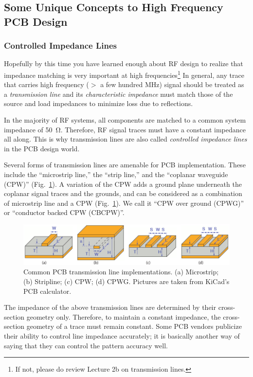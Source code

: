 \documentclass[12pt,letterpaper]{scrartcl}
\begin{document}
\subsection{Some Unique Concepts to High Frequency PCB Design}

\subsubsection{Controlled Impedance Lines}

Hopefully by this time you have learned enough about RF design to realize that impedance matching is very important at high frequencies\footnote{If not, please do review Lecture 2b on transmission lines.} In general, any trace that carries high frequency ($>$ a few hundred MHz) signal should be treated as a \textit{transmission line} and its \textit{characteristic impedance} must match those of the source and load impedances to minimize loss due to reflections. 

In the majority of RF systems, all components are matched to a common system impedance of \SI{50}{\ohm}. Therefore, RF signal traces must have a constant impedance all along. This is why transmission lines are also called \textit{controlled impedance lines} in the PCB design world. 

Several forms of transmission lines are amenable for PCB implementation. These include the ``microstrip line,'' the ``strip line,'' and the ``coplanar waveguide (CPW)'' (Fig.~\ref{fig:tlines}). A variation of the CPW adds a ground plane underneath the coplanar signal traces and the grounds, and can be considered as a combination of microstrip line and a CPW (Fig.~\ref{fig:tlines}). We call it ``CPW over ground (CPWG)'' or ``conductor backed CPW (CBCPW)''. 

	\begin{figure}[h]
		\centering
		\includegraphics[width=6in]{tlines}
		\caption{Common PCB transmission line implementations. (a) Microstrip; (b) Stripline; (c) CPW; (d) CPWG. Pictures are taken from KiCad's PCB calculator.}
		\label{fig:tlines}
	\end{figure}
	
The impedance of the above transmission lines are determined by their cross-section geometry only. Therefore, to maintain a constant impedance, the cross-section geometry of a trace must remain constant. Some PCB vendors publicize their ability to control line impedance accurately; it is basically another way of saying that they can control the pattern accuracy well. 
\end{document}
